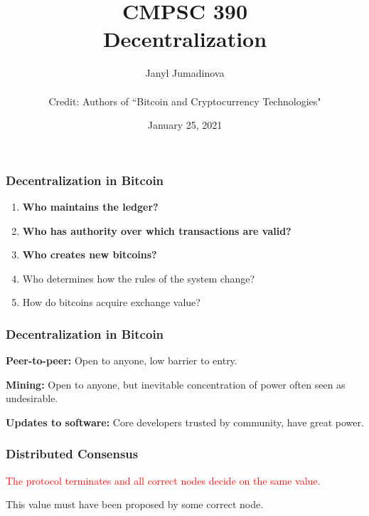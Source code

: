 \documentclass{beamer}
\title{CMPSC 390 \\ Decentralization}
\author{Janyl Jumadinova \\ $ $ \\ Credit: Authors of ``Bitcoin and Cryptocurrency Technologies"}
\date{January 25, 2021}
\begin{document}
\begin{frame}
  \titlepage
\end{frame}

\begin{frame}
  \frametitle{Decentralization in Bitcoin}
	\begin{enumerate}
		\item \textbf{Who maintains the ledger?}
		\item \textbf{Who has authority over which transactions are valid?}
		\item \textbf{Who creates new bitcoins?}
		\item Who determines how the rules of the system change?
		\item How do bitcoins acquire exchange value?
	\end{enumerate}
\end{frame}
\begin{frame}
  \frametitle{Decentralization in Bitcoin}
  
  \begin{block}{\textbf{Peer-to-peer:}}
  Open to anyone, low barrier to entry.
   \end{block}
 	
     \begin{block}{\textbf{Mining:}}
  Open to anyone, but inevitable concentration of power
    often seen as undesirable.
 	\end{block}
 	
     \begin{block}{\textbf{Updates to software:}}
  Core developers trusted by community, have great power.
 	\end{block} 		
\end{frame}
\begin{frame}
  \frametitle{Distributed Consensus}

     \begin{block}{\textcolor{red}{The protocol terminates and all correct nodes decide on the same value.}}
 	\end{block} 

     This value must have been proposed by some correct node.
\end{frame}
\end{document}
